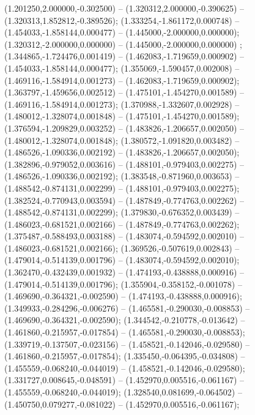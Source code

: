  (1.201250,2.000000,-0.302500) -- (1.320312,2.000000,-0.390625) -- (1.320313,1.852812,-0.389526);
 (1.333254,-1.861172,0.000748) -- (1.454033,-1.858144,0.000477) -- (1.445000,-2.000000,0.000000);
 (1.320312,-2.000000,0.000000) -- (1.445000,-2.000000,0.000000) ;
 (1.344865,-1.724476,0.001419) -- (1.462083,-1.719659,0.000902) -- (1.454033,-1.858144,0.000477);
 (1.355069,-1.590457,0.002008) -- (1.469116,-1.584914,0.001273) -- (1.462083,-1.719659,0.000902);
 (1.363797,-1.459656,0.002512) -- (1.475101,-1.454270,0.001589) -- (1.469116,-1.584914,0.001273);
 (1.370988,-1.332607,0.002928) -- (1.480012,-1.328074,0.001848) -- (1.475101,-1.454270,0.001589);
 (1.376594,-1.209829,0.003252) -- (1.483826,-1.206657,0.002050) -- (1.480012,-1.328074,0.001848);
 (1.380572,-1.091820,0.003482) -- (1.486526,-1.090336,0.002192) -- (1.483826,-1.206657,0.002050);
 (1.382896,-0.979052,0.003616) -- (1.488101,-0.979403,0.002275) -- (1.486526,-1.090336,0.002192);
 (1.383548,-0.871960,0.003653) -- (1.488542,-0.874131,0.002299) -- (1.488101,-0.979403,0.002275);
 (1.382524,-0.770943,0.003594) -- (1.487849,-0.774763,0.002262) -- (1.488542,-0.874131,0.002299);
 (1.379830,-0.676352,0.003439) -- (1.486023,-0.681521,0.002166) -- (1.487849,-0.774763,0.002262);
 (1.375487,-0.588493,0.003188) -- (1.483074,-0.594592,0.002010) -- (1.486023,-0.681521,0.002166);
 (1.369526,-0.507619,0.002843) -- (1.479014,-0.514139,0.001796) -- (1.483074,-0.594592,0.002010);
 (1.362470,-0.432439,0.001932) -- (1.474193,-0.438888,0.000916) -- (1.479014,-0.514139,0.001796);
 (1.355904,-0.358152,-0.001078) -- (1.469690,-0.364321,-0.002590) -- (1.474193,-0.438888,0.000916);
 (1.349933,-0.284296,-0.006276) -- (1.465581,-0.290030,-0.008853) -- (1.469690,-0.364321,-0.002590);
 (1.344542,-0.210778,-0.013642) -- (1.461860,-0.215957,-0.017854) -- (1.465581,-0.290030,-0.008853);
 (1.339719,-0.137507,-0.023156) -- (1.458521,-0.142046,-0.029580) -- (1.461860,-0.215957,-0.017854);
 (1.335450,-0.064395,-0.034808) -- (1.455559,-0.068240,-0.044019) -- (1.458521,-0.142046,-0.029580);
 (1.331727,0.008645,-0.048591) -- (1.452970,0.005516,-0.061167) -- (1.455559,-0.068240,-0.044019);
 (1.328540,0.081699,-0.064502) -- (1.450750,0.079277,-0.081022) -- (1.452970,0.005516,-0.061167);
